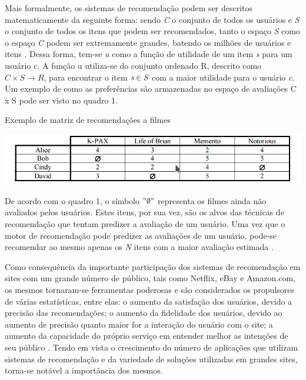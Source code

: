 \documentclass[12pt, openright, oneside, a4paper, brazil]{abntex2}
\begin{document}
Mais formalmente, os sistemas de recomendação podem ser descritos matematicamente da seguinte forma: sendo \emph{C} o conjunto de todos os usuários e \emph{S} o conjunto de todos os itens que podem ser recomendados, tanto o espaço \emph{S} como o espaço \emph{C} podem ser extremamente grandes, batendo os milhões de usuários e itens \cite{adomavicius2005toward, gomez2016netflix}. Dessa forma, tem-se \textit{u} como a função de utilidade de um item \emph{s} para um usuário c. A função u utiliza-se do conjunto ordenado R, descrito como $C \times S \rightarrow R$, para encontrar o item $\emph{s} \in \emph{S}$ com a maior utilidade para o usuário \emph{c}. Um exemplo de como as preferências são armazenadas no espaço de avaliações C x S pode ser visto no quadro 1.

\begin{quadro}[h!tp]
	\caption{\label{movie_matrix}Exemplo de matriz de recomendações a filmes}
	\begin{center}
		\includegraphics[scale=0.8]{images/movie_matrix.png}
	\end{center}
\end{quadro}

De acordo com o quadro 1, o símbolo $"\emptyset"$ representa os filmes ainda não avaliados pelos usuários. Estes itens, por sua vez, são os alvos das técnicas de recomendação que tentam predizer a avaliação de um usuário. Uma vez que o motor de recomendação pode predizer as avaliações de um usuário, pode-se recomendar ao mesmo apenas os \emph{N} itens com a maior avaliação estimada \cite{adomavicius2005toward}.

Como consequência da importante participação dos sistemas de recomendação em sites com um grande número de público, tais como Netflix, eBay e Amazon.com, os mesmos tornaram-se ferramentas poderosas \cite{schafer1999recommender} e são considerados os propulsores de várias estatísticas, entre elas: o aumento da satisfação dos usuários, devido a precisão das recomendações; o aumento da fidelidade dos usuários, devido ao aumento de precisão quanto maior for a interação do usuário com o site; a aumento da capacidade do próprio serviço em entender melhor as intenções de seu público \cite{ricci2011introduction}. Tendo em vista o crescimento do número de aplicações que utilizam sistemas de recomendação e da variedade de soluções utilizadas em grandes sites, torna-se notável a importância dos mesmos.
\end{document}
